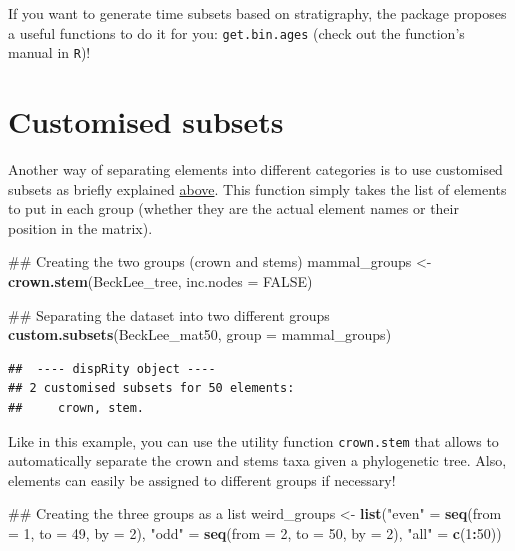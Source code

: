 \documentclass[]{book}
\newenvironment{Shaded}{\begin{snugshade}}{\end{snugshade}}
\newcommand{\KeywordTok}[1]{\textcolor[rgb]{0.13,0.29,0.53}{\textbf{#1}}}
\newcommand{\DataTypeTok}[1]{\textcolor[rgb]{0.13,0.29,0.53}{#1}}
\newcommand{\DecValTok}[1]{\textcolor[rgb]{0.00,0.00,0.81}{#1}}
\newcommand{\StringTok}[1]{\textcolor[rgb]{0.31,0.60,0.02}{#1}}
\newcommand{\OtherTok}[1]{\textcolor[rgb]{0.56,0.35,0.01}{#1}}
\newcommand{\OperatorTok}[1]{\textcolor[rgb]{0.81,0.36,0.00}{\textbf{#1}}}
\newcommand{\NormalTok}[1]{#1}
\theoremstyle{definition}
\theoremstyle{definition}
\theoremstyle{definition}
\theoremstyle{remark}
\begin{document}
If you want to generate time subsets based on stratigraphy, the package
proposes a useful functions to do it for you: \texttt{get.bin.ages}
(check out the function's manual in \texttt{R})!

\hypertarget{customised-subsets}{\section{Customised
subsets}\label{customised-subsets}}

Another way of separating elements into different categories is to use
customised subsets as briefly explained
\protect\hyperlink{disparity-among-groups}{above}. This function simply
takes the list of elements to put in each group (whether they are the
actual element names or their position in the matrix).

\begin{Shaded}
\begin{Highlighting}[]
\NormalTok{## Creating the two groups (crown and stems)}
\NormalTok{mammal_groups <-}\StringTok{ }\KeywordTok{crown.stem}\NormalTok{(BeckLee_tree, }\DataTypeTok{inc.nodes =} \OtherTok{FALSE}\NormalTok{)}

\NormalTok{## Separating the dataset into two different groups}
\KeywordTok{custom.subsets}\NormalTok{(BeckLee_mat50, }\DataTypeTok{group =}\NormalTok{ mammal_groups)}
\end{Highlighting}
\end{Shaded}

\begin{verbatim}
##  ---- dispRity object ---- 
## 2 customised subsets for 50 elements:
##     crown, stem.
\end{verbatim}

Like in this example, you can use the utility function
\texttt{crown.stem} that allows to automatically separate the crown and
stems taxa given a phylogenetic tree. Also, elements can easily be
assigned to different groups if necessary!

\begin{Shaded}
\begin{Highlighting}[]
\NormalTok{## Creating the three groups as a list}
\NormalTok{weird_groups <-}\StringTok{ }\KeywordTok{list}\NormalTok{(}\StringTok{"even"}\NormalTok{ =}\StringTok{ }\KeywordTok{seq}\NormalTok{(}\DataTypeTok{from =} \DecValTok{1}\NormalTok{, }\DataTypeTok{to =} \DecValTok{49}\NormalTok{, }\DataTypeTok{by =} \DecValTok{2}\NormalTok{),}
                      \StringTok{"odd"}\NormalTok{ =}\StringTok{ }\KeywordTok{seq}\NormalTok{(}\DataTypeTok{from =} \DecValTok{2}\NormalTok{, }\DataTypeTok{to =} \DecValTok{50}\NormalTok{, }\DataTypeTok{by =} \DecValTok{2}\NormalTok{),}
                      \StringTok{"all"}\NormalTok{ =}\StringTok{ }\KeywordTok{c}\NormalTok{(}\DecValTok{1}\OperatorTok{:}\DecValTok{50}\NormalTok{))}
\end{Highlighting}
\end{Shaded}
\end{document}

